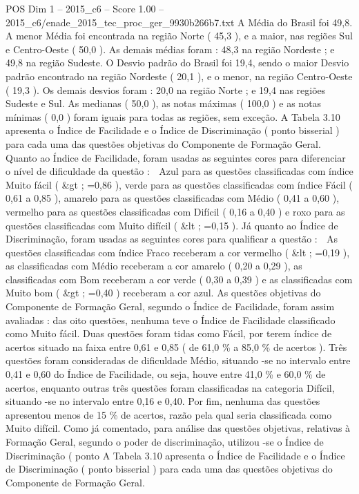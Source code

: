 \begin{textsample}{POS Dim 1 – 2015\_c6 – Score 1.00 – 2015\_c6/enade\_2015\_tec\_proc\_ger\_9930b266b7.txt}
A Média do Brasil foi 49,8.
A menor Média foi encontrada na região Norte ( 45,3 ), e a maior, nas regiões Sul e Centro-Oeste ( 50,0 ).
As demais médias foram : 48,3 na região Nordeste ; e 49,8 na região Sudeste.
O Desvio padrão do Brasil foi 19,4, sendo o maior Desvio padrão encontrado na região Nordeste ( 20,1 ), e o menor, na região Centro-Oeste ( 19,3 ).
Os demais desvios foram : 20,0 na região Norte ; e 19,4 nas regiões Sudeste e Sul.
As medianas ( 50,0 ), as notas máximas ( 100,0 ) e as notas mínimas ( 0,0 ) foram iguais para todas as regiões, sem exceção.
A Tabela 3.10 apresenta o Índice de Facilidade e o Índice de Discriminação ( ponto bisserial ) para cada uma das questões objetivas do Componente de Formação Geral.
Quanto ao Índice de Facilidade, foram usadas as seguintes cores para diferenciar o nível de dificuldade da questão :  Azul para as questões classificadas com índice Muito fácil ( \&gt ; =0,86 ), verde para as questões classificadas com índice Fácil ( 0,61 a 0,85 ), amarelo para as questões classificadas com Médio ( 0,41 a 0,60 ), vermelho para as questões classificadas com Difícil ( 0,16 a 0,40 ) e roxo para as questões classificadas com Muito difícil ( \&lt ; =0,15 ).
Já quanto ao Índice de Discriminação, foram usadas as seguintes cores para qualificar a questão :  As questões classificadas com índice Fraco receberam a cor vermelho ( \&lt ; =0,19 ), as classificadas com Médio receberam a cor amarelo ( 0,20 a 0,29 ), as classificadas com Bom receberam a cor verde ( 0,30 a 0,39 ) e as classificadas com Muito bom ( \&gt ; =0,40 ) receberam a cor azul.
As questões objetivas do Componente de Formação Geral, segundo o Índice de Facilidade, foram assim avaliadas : das oito questões, nenhuma teve o Índice de Facilidade classificado como Muito fácil.
Duas questões foram tidas como Fácil, por terem índice de acertos situado na faixa entre 0,61 e 0,85 ( de 61,0 \% a 85,0 \% de acertos ).
Três questões foram consideradas de dificuldade Médio, situando -se no intervalo entre 0,41 e 0,60 do Índice de Facilidade, ou seja, houve entre 41,0 \% e 60,0 \% de acertos, enquanto outras três questões foram classificadas na categoria Difícil, situando -se no intervalo entre 0,16 e 0,40.
Por fim, nenhuma das questões apresentou menos de 15 \% de acertos, razão pela qual seria classificada como Muito difícil.
Como já comentado, para análise das questões objetivas, relativas à Formação Geral, segundo o poder de discriminação, utilizou -se o Índice de Discriminação ( ponto A Tabela 3.10 apresenta o Índice de Facilidade e o Índice de Discriminação ( ponto bisserial ) para cada uma das questões objetivas do Componente de Formação Geral.

\end{textsample}
